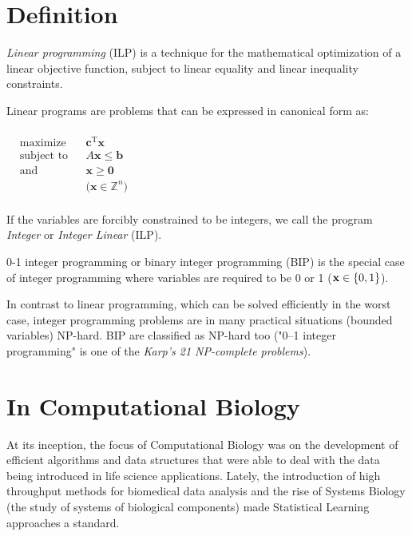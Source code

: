 \section{Definition} 
\textit{Linear programming} (ILP) is a technique for the mathematical optimization of a linear objective function, subject to linear equality and linear inequality constraints.

Linear programs are problems that can be expressed in canonical form as:
\paragraph{}

${\displaystyle {\begin{aligned}
	&{\text{maximize}}&&\mathbf {c} ^{\mathrm {T} }\mathbf {x}
	\\&{\text{subject to}}&&A\mathbf {x} \leq \mathbf {b}
	\\&{\text{and}}&&\mathbf {x} \geq \mathbf {0}
	\\&&&{\text{(}}\mathbf {x} \in \mathbb {Z} ^{n}\text{)}
	\\&
	\end{aligned}}} $


If the variables are forcibly constrained to be integers, we call the program \textit{Integer} or \textit{Integer Linear} (ILP).

0-1 integer programming or binary integer programming (BIP) is the special case of integer programming where variables are required to be 0 or 1 ($\mathbf {x} \in \mathbb \{0,1\} $).

In contrast to linear programming, which can be solved efficiently in the worst case, integer programming problems are in many practical situations (bounded variables) NP-hard. BIP are classified as NP-hard too ("0–1 integer programming" is one of the \textit{Karp's 21 NP-complete problems}).

\section{In Computational Biology}

At its inception, the focus of Computational Biology was on the development of efficient algorithms and data structures that were able to deal with the data being introduced in life science applications. Lately, the introduction of high throughput methods for biomedical data analysis and the rise of Systems Biology (the study of systems of biological components) made Statistical Learning approaches a standard.


